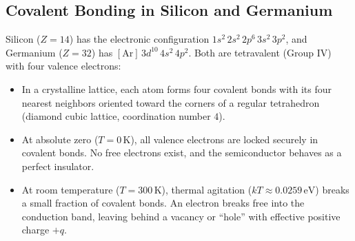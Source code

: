 \documentclass[12pt,a4paper]{article}
\begin{document}
\subsection{Covalent Bonding in Silicon and Germanium}
Silicon ($Z=14$) has the electronic configuration $1s^2\,2s^2\,2p^6\,3s^2\,3p^2$, and Germanium ($Z=32$) has $[\text{Ar}]\,3d^{10}\,4s^2\,4p^2$. Both are tetravalent (Group IV) with four valence electrons:

\begin{itemize}[leftmargin=*, itemsep=3pt]
  \item In a crystalline lattice, each atom forms four covalent bonds with its four nearest neighbors oriented toward the corners of a regular tetrahedron (diamond cubic lattice, coordination number $4$).
  \item At absolute zero ($T = 0\,\text{K}$), all valence electrons are locked securely in covalent bonds. No free electrons exist, and the semiconductor behaves as a perfect insulator.
  \item At room temperature ($T = 300\,\text{K}$), thermal agitation ($k T \approx 0.0259\,\text{eV}$) breaks a small fraction of covalent bonds. An electron breaks free into the conduction band, leaving behind a vacancy or ``hole'' with effective positive charge $+q$.
\end{itemize}
\end{document}
